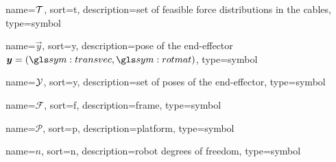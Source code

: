 	{%
		name=\ensuremath{\set{T}},
		sort=t,
		description=set of feasible force distributions in the cables,
		type=symbol
	}
	\newcommand{\setoffeasibleforces}{\gls{sym:setoffeasibleforces}}

	{%
		name=\ensuremath{\vec{y}},
		sort=y,
		description=pose of the end-effector \ensuremath{\vec{y} = (\transvec, \rotmatbare)},
		type=symbol
	}
	\newcommand{\pose}{\gls{sym:pose}}

	{%
		name=\ensuremath{\set{Y}},
		sort=y,
		description=set of poses of the end-effector,
		type=symbol
	}
	\newcommand{\setofposes}{\gls{sym:setofposes}}

	{%
		name=\ensuremath{\mathscr{F}},
		sort=f,
		description=frame,
		type=symbol
	}
	\newcommand{\framesym}{\gls{sym:frame}}

	{%
		name=\ensuremath{\mathscr{P}},
		sort=p,
		description=platform,
		type=symbol
	}
	\newcommand{\platform}{\gls{sym:platform}}
	\newcommand{\platformframe}{\framesym_{\platform}}
	\newcommand{\worldframe}{\framesym_{\world}} %

	{%
		name=\ensuremath{n},
		sort=n,
		description=robot degrees of freedom,
		type=symbol
	}
	\newcommand{\robotdof}{\gls{sym:robotdof}}


